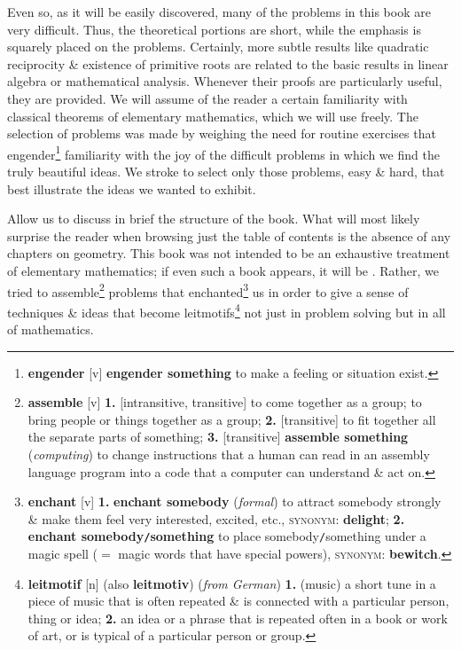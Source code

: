 \documentclass[oneside]{book}
\numberwithin{equation}{section}
\begin{document}
Even so, as it will be easily discovered, many of the problems in this book are very difficult. Thus, the theoretical portions are short, while the emphasis is squarely placed on the problems. Certainly, more subtle results like quadratic reciprocity \& existence of primitive roots are related to the basic results in linear algebra or mathematical analysis. Whenever their proofs are particularly useful, they are provided. We will assume of the reader a certain familiarity with classical theorems of elementary mathematics, which we will use freely. The selection of problems was made by weighing the need for routine exercises that engender\footnote{\textbf{engender} [v] \textbf{engender something} to make a feeling or situation exist.} familiarity with the joy of the difficult problems in which we find the truly beautiful ideas. We stroke to select only those problems, easy \& hard, that best illustrate the ideas we wanted to exhibit.

Allow us to discuss in brief the structure of the book. What will most likely surprise the reader when browsing just the table of contents is the absence of any chapters on geometry. This book was not intended to be an exhaustive treatment of elementary mathematics; if even such a book appears, it will be . Rather, we tried to assemble\footnote{\textbf{assemble} [v] \textbf{1.} [intransitive, transitive] to come together as a group; to bring people or things together as a group; \textbf{2.} [transitive] to fit together all the separate parts of something; \textbf{3.} [transitive] \textbf{assemble something} (\textit{computing}) to change instructions that a human can read in an assembly language program into a code that a computer can understand \& act on.} problems that enchanted\footnote{\textbf{enchant} [v] \textbf{1.} \textbf{enchant somebody} (\textit{formal}) to attract somebody strongly \& make them feel very interested, excited, etc., \textsc{synonym}: \textbf{delight}; \textbf{2.} \textbf{enchant somebody\texttt{/}something} to place somebody\texttt{/}something under a magic spell ($=$ magic words that have special powers), \textsc{synonym}: \textbf{bewitch}.} us in order to give a sense of techniques \& ideas that become leitmotifs\footnote{\textbf{leitmotif} [n] (also \textbf{leitmotiv}) (\textit{from German}) \textbf{1.} (music) a short tune in a piece of music that is often repeated \& is connected with a particular person, thing or idea; \textbf{2.} an idea or a phrase that is repeated often in a book or work of art, or is typical of a particular person or group.} not just in problem solving but in all of mathematics.
\end{document}
